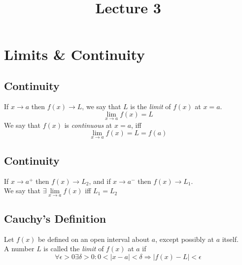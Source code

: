 \documentclass[fleqn]{article}
\title{Lecture 3}
\author{}
\date{\formatdate{4}{11}{2014}}
\begin{document}
	
\maketitle
\setlength{\mathindent}{0pt}

\tableofcontents

\newpage
\section{Limits \& Continuity}

\subsection{Continuity}

If $x \rightarrow a$ then $f(x) \rightarrow L$, we say that $L$ is the \emph{limit} of $f(x)$ at $x = a$.
\begin{equation*}
	\lim\limits_{x \rightarrow a} f(x) = L
\end{equation*}
We say that $f(x)$ is \emph{continuous} at $x = a$, iff \begin{equation*}
	\lim\limits_{x \rightarrow a} f(x) = L = f(a)
\end{equation*}

\subsection{Continuity}

If $x \rightarrow a^+$ then $f(x) \rightarrow L_2$, and if $x \rightarrow a^-$ then $f(x) \rightarrow L_1$.\\
We say that $\exists \lim\limits_{x \rightarrow a} f(x)$ iff $L_1 = L_2$

\subsection{Cauchy's Definition}

Let $f(x)$ be defined on an open interval about $a$, except possibly at $a$ itself.\\
A number $L$ is called the \emph{limit} of $f(x)$ at $a$ if
\begin{equation}
	\forall \epsilon > 0 \exists \delta > 0 : 0 < |x - a| < \delta \Rightarrow |f(x) - L| < \epsilon
\end{equation}
\end{document}
